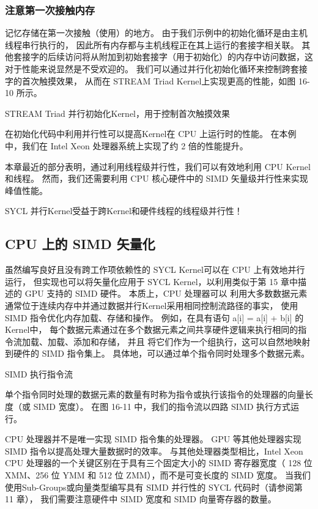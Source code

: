 \subsubsection{注意第一次接触内存}
记忆存储在第一次接触（使用）的地方。 由于我们示例中的初始化循环是由主机线程串行执行的，
因此所有内存都与主机线程正在其上运行的套接字相关联。 
其他套接字的后续访问将从附加到初始套接字（用于初始化）的内存中访问数据，这对于性能来说显然是不受欢迎的。 
我们可以通过并行化初始化循环来控制跨套接字的首次触摸效果，
从而在 STREAM Triad Kernel上实现更高的性能，如图 16-10 所示。

{\color{red} STREAM Triad 并行初始化Kernel，用于控制首次触摸效果}

在初始化代码中利用并行性可以提高Kernel在 CPU 上运行时的性能。 
在本例中，我们在 Intel Xeon 处理器系统上实现了约 2 倍的性能提升。

本章最近的部分表明，通过利用线程级并行性，我们可以有效地利用 CPU Kernel和线程。 
然而，我们还需要利用 CPU 核心硬件中的 SIMD 矢量级并行性来实现峰值性能。

\begin{remark}
	SYCL 并行Kernel受益于跨Kernel和硬件线程的线程级并行性！
\end{remark}

\subsection{CPU 上的 SIMD 矢量化}
虽然编写良好且没有跨工作项依赖性的 SYCL Kernel可以在 CPU 上有效地并行运行，
但实现也可以将矢量化应用于 SYCL Kernel，以利用类似于第 15 章中描述的 GPU 支持的 SIMD 硬件。
本质上，CPU 处理器可以 利用大多数数据元素通常位于连续内存中并通过数据并行Kernel采用相同控制流路径的事实，
使用 SIMD 指令优化内存加载、存储和操作。 
例如，在具有语句 a[i] = a[i] + b[i] 的Kernel中，
每个数据元素通过在多个数据元素之间共享硬件逻辑来执行相同的指令流加载、加载、添加和存储，
并且 将它们作为一个组执行，这可以自然地映射到硬件的 SIMD 指令集上。 
具体地，可以通过单个指令同时处理多个数据元素。

{\color{red} SIMD 执行指令流}

单个指令同时处理的数据元素的数量有时称为指令或执行该指令的处理器的向量长度（或 SIMD 宽度）。 
在图 16-11 中，我们的指令流以四路 SIMD 执行方式运行。

CPU 处理器并不是唯一实现 SIMD 指令集的处理器。 GPU 等其他处理器实现 SIMD 指令以提高处理大量数据时的效率。 
与其他处理器类型相比，Intel Xeon CPU 处理器的一个关键区别在于具有三个固定大小的 SIMD 寄存器宽度（
128 位 XMM、256 位 YMM 和 512 位 ZMM），而不是可变长度的 SIMD 宽度。 
当我们使用Sub-Groups或向量类型编写具有 SIMD 并行性的 SYCL 代码时（请参阅第 11 章），
我们需要注意硬件中 SIMD 宽度和 SIMD 向量寄存器的数量。

